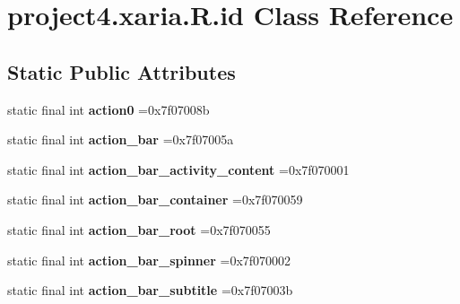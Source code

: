 \hypertarget{classproject4_1_1xaria_1_1R_1_1id}{}\section{project4.\+xaria.\+R.\+id Class Reference}
\label{classproject4_1_1xaria_1_1R_1_1id}
\subsection*{Static Public Attributes}
\begin{DoxyCompactItemize}
\item 
\mbox{\label{classproject4_1_1xaria_1_1R_1_1id_a087ccbe88a47c683d122194fb029df71}} 
static final int {\bfseries action0} =0x7f07008b
\item 
\mbox{\label{classproject4_1_1xaria_1_1R_1_1id_a5be06480e8bace7d51c88015b57184c5}} 
static final int {\bfseries action\+\_\+bar} =0x7f07005a
\item 
\mbox{\label{classproject4_1_1xaria_1_1R_1_1id_a9de39b3e6cb00a8b1779b95ab1478b66}} 
static final int {\bfseries action\+\_\+bar\+\_\+activity\+\_\+content} =0x7f070001
\item 
\mbox{\label{classproject4_1_1xaria_1_1R_1_1id_af6321d7e4115b51ef80124c24f954487}} 
static final int {\bfseries action\+\_\+bar\+\_\+container} =0x7f070059
\item 
\mbox{\label{classproject4_1_1xaria_1_1R_1_1id_aa81bb163ed12fa0d677da3beb035976a}} 
static final int {\bfseries action\+\_\+bar\+\_\+root} =0x7f070055
\item 
\mbox{\label{classproject4_1_1xaria_1_1R_1_1id_a79e97dc2c4ad9c408b47dba95a66fc47}} 
static final int {\bfseries action\+\_\+bar\+\_\+spinner} =0x7f070002
\item 
\mbox{\label{classproject4_1_1xaria_1_1R_1_1id_a394766e6927a5e952b2f3a643d059c56}} 
static final int {\bfseries action\+\_\+bar\+\_\+subtitle} =0x7f07003b
\item 

\end{DoxyCompactItemize}

